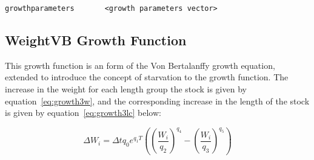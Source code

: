 \documentclass [a4paper, 10pt]{book}
\begin{document}
{\small\begin{verbatim}
growthparameters       <growth parameters vector>
\end{verbatim}}

%
%
%

\subsection{WeightVB Growth Function}\label{subsec:growth3}
This growth function is an form of the Von Bertalanffy growth equation\footnotemark, extended to introduce the concept of starvation to the growth function.  The increase in the weight for each length group the stock is given by equation~\ref{eq:growth3w}, and the corresponding increase in the length of the stock is given by equation~\ref{eq:growth3lc} below:

\begin{equation}\label{eq:growth3w}
\Delta W_{i} = \Delta t q_{0} e^{q_{1} T}\left(
\left( \frac{W_{i}}{q_{2}} \right)^{q_{4}} -
\left( \frac{W_{i}}{q_{3}} \right)^{q_{5}} \right)
\end{equation}
\end{document}
